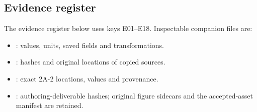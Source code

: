 \documentclass[10pt,a4paper]{article}
\begin{document}
\subsection{Evidence register}\label{sec:evidence}
{\raggedright The evidence register below uses keys E01--E18. Inspectable companion files are:
\begin{itemize}[itemsep=1pt,topsep=2pt]
\item {}: values, units, saved fields and transformations.
\item {}: hashes and original locations of copied sources.
\item {}: exact 2A-2 locations, values and provenance.
\item {}: authoring-deliverable hashes; original figure sidecars and the accepted-asset manifest are retained.
\end{itemize}\par}
\end{document}
